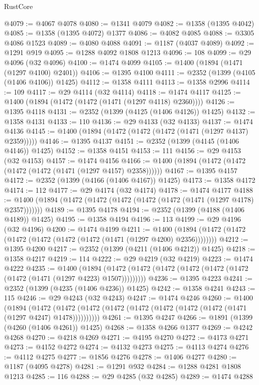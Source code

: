 \begin{lexlean}{RustCore}
\begin{coremodule}
@4079 := @4067 @4078
@4080 := @1341 @4079
@4082 := @1358 (@1395 @4042)
@4085 := @1358 (@1395 @4072) @1377
@4086 := @4082 @4085
@4088 := @3305 @4086 @1523
@4089 := @4080 @4088
@4091 := @1187 (@4037 @4089)
@4092 := @1291 @919
@4095 := @1288 @4092 @1808 @1213
@4096 := 108
@4099 := @29 @4096 (@32 @4096)
@4100 := @1474 @4099
@4105 := @1400 (@1894 (@1471 (@1297 @4100) @2401))
@4106 := @1395 @4100
@4111 := @2352 (@1399 (@4105 (@1406 @4106)) @1425)
@4112 := @1358 @4111
@4113 := @1358 @2996
@4114 := 109
@4117 := @29 @4114 (@32 @4114)
@4118 := @1474 @4117
@4125 := @1400 (@1894 (@1472 (@1472 (@1471 (@1297 @4118) @2360))))
@4126 := @1395 @4118
@4131 := @2352 (@1399 (@4125 (@1406 @4126)) @1425)
@4132 := @1358 @4131
@4133 := 110
@4136 := @29 @4133 (@32 @4133)
@4137 := @1474 @4136
@4145 := @1400 (@1894 (@1472 (@1472 (@1472 (@1471 (@1297 @4137) @2359)))))
@4146 := @1395 @4137
@4151 := @2352 (@1399 (@4145 (@1406 @4146)) @1425)
@4152 := @1358 @4151
@4153 := 111
@4156 := @29 @4153 (@32 @4153)
@4157 := @1474 @4156
@4166 := @1400 (@1894 (@1472 (@1472 (@1472 (@1472 (@1471 (@1297 @4157) @2358))))))
@4167 := @1395 @4157
@4172 := @2352 (@1399 (@4166 (@1406 @4167)) @1425)
@4173 := @1358 @4172
@4174 := 112
@4177 := @29 @4174 (@32 @4174)
@4178 := @1474 @4177
@4188 := @1400 (@1894 (@1472 (@1472 (@1472 (@1472 (@1472 (@1471 (@1297 @4178) @2357)))))))
@4189 := @1395 @4178
@4194 := @2352 (@1399 (@4188 (@1406 @4189)) @1425)
@4195 := @1358 @4194
@4196 := 113
@4199 := @29 @4196 (@32 @4196)
@4200 := @1474 @4199
@4211 := @1400 (@1894 (@1472 (@1472 (@1472 (@1472 (@1472 (@1472 (@1471 (@1297 @4200) @2356))))))))
@4212 := @1395 @4200
@4217 := @2352 (@1399 (@4211 (@1406 @4212)) @1425)
@4218 := @1358 @4217
@4219 := 114
@4222 := @29 @4219 (@32 @4219)
@4223 := @1474 @4222
@4235 := @1400
    (@1894 (@1472 (@1472 (@1472 (@1472 (@1472 (@1472 (@1472 (@1471 (@1297 @4223) @1507)))))))))
@4236 := @1395 @4223
@4241 := @2352 (@1399 (@4235 (@1406 @4236)) @1425)
@4242 := @1358 @4241
@4243 := 115
@4246 := @29 @4243 (@32 @4243)
@4247 := @1474 @4246
@4260 := @1400
    (@1894
      (@1472 (@1472 (@1472 (@1472 (@1472 (@1472 (@1472 (@1472 (@1471 (@1297 @4247) @1478))))))))))
@4261 := @1395 @4247
@4266 := @1891 (@1399 (@4260 (@1406 @4261)) @1425)
@4268 := @1358 @4266 @1377
@4269 := @4242 @4268
@4270 := @4218 @4269
@4271 := @4195 @4270
@4272 := @4173 @4271
@4273 := @4152 @4272
@4274 := @4132 @4273
@4275 := @4113 @4274
@4276 := @4112 @4275
@4277 := @1856 @4276
@4278 := @1406 @4277
@4280 := @1187 (@4095 @4278)
@4281 := @1291 @932
@4284 := @1288 @4281 @1808 @1213
@4285 := 116
@4288 := @29 @4285 (@32 @4285)
@4289 := @1474 @4288

\end{coremodule}
\end{lexlean}
